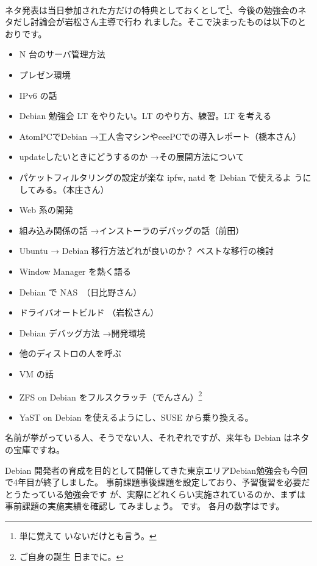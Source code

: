 \documentclass[mingoth,a4paper]{jsarticle}
\begin{document}
ネタ発表は当日参加された方だけの特典としておくとして\footnote{単に覚えて
いないだけとも言う。}、今後の勉強会のネタだし討論会が岩松さん主導で行わ
れました。そこで決まったものは以下のとおりです。
\begin{itemize}
 \item N 台のサーバ管理方法
 \item プレゼン環境
 \item IPv6 の話
 \item Debian 勉強会 LT をやりたい。LT のやり方、練習。LT を考える
 \item AtomPCでDebian →工人舎マシンやeeePCでの導入レポート（橋本さん）
 \item updateしたいときにどうするのか →その展開方法について
 \item パケットフィルタリングの設定が楽な ipfw, natd を Debian で使えるよ
       うにしてみる。（本庄さん）
 \item Web 系の開発
 \item 組み込み関係の話 →インストーラのデバッグの話（前田）
 \item Ubuntu → Debian 移行方法どれが良いのか？ ベストな移行の検討
 \item Window Manager を熱く語る
 \item Debian で NAS　（日比野さん）
 \item ドライバオートビルド （岩松さん）
 \item Debian デバッグ方法 →開発環境
 \item 他のディストロの人を呼ぶ
 \item VM の話
 \item ZFS on Debian をフルスクラッチ（でんさん）\footnote{ご自身の誕生
       日までに。}
 \item YaST on Debian を使えるようにし、SUSE から乗り換える。
\end{itemize}

名前が挙がっている人、そうでない人、それぞれですが、来年も Debian はネタ
の宝庫ですね。




\label{sec:debmtg2008results}

Debian 開発者の育成を目的として開催してきた東京エリアDebian勉強会も今回
で4年目が終了しました。
事前課題事後課題を設定しており、予習復習を必要だとうたっている勉強会です
が、実際にどれくらい実施されているのか、まずは事前課題の実施実績を確認し
てみましょう。
です。
各月の数字はです。
\end{document}
